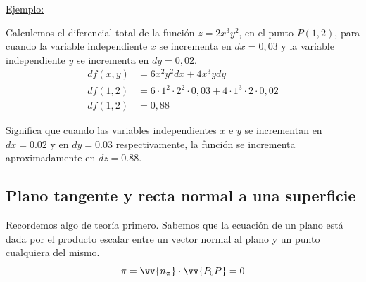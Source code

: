 \documentclass[12pt]{article}
\begin{document}
\underline{Ejemplo:}

Calculemos el diferencial total de la función $ z = 2x^3y^2 $, en el punto $ P(1,2) $, para cuando la variable independiente $ x $ se incrementa en $ dx=0,03 $ y la variable independiente $ y $ se incrementa en $ dy=0,02 $.
\begin{align*}
  df(x,y) &= 6x^2y^2dx+4x^3ydy\\
  df(1,2) &= 6\cdot 1^2\cdot 2^2\cdot 0,03+4\cdot 1^3\cdot 2\cdot 0,02\\
  df(1,2) &= 0,88
\end{align*}

Significa que cuando las variables independientes $ x $ e $ y $ se incrementan en $ dx = 0.02 $ y en $ dy=0.03 $ respectivamente, la función se incrementa aproximadamente en $ dz=0.88 $.


\subsection{Plano tangente y recta normal a una superficie}
%
%
%
%
%
Recordemos algo de teoría primero. Sabemos que la ecuación de un plano está dada por el producto escalar entre un vector normal al plano y un punto cualquiera del mismo.
\[
\pi = \vv{n_{\pi}}\cdot \vv{P_{0}P} = 0
\]
\end{document}
